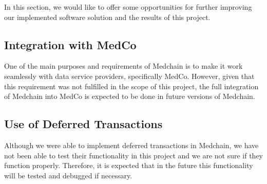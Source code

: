 In this section, we would like to offer some opportunities for further improving our implemented software solution and the results of this project. 

\subsection{Integration with MedCo}
One of the main purposes and requirements of Medchain is to make it work seamlessly with data service providers, specifically MedCo. However, given that this requirement was not fulfilled in the scope of this project, the full integration of Medchain into MedCo is expected to be done in future versions of Medchain.  

\subsection{Use of Deferred Transactions}
Although we were able to implement deferred transactions in Medchain, we have not been able to test their functionality in this project and we are not sure if they function properly. Therefore, it is expected that in the future this functionality will be tested and debugged if necessary. 
